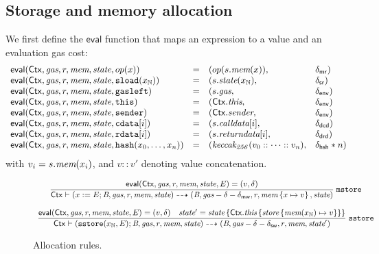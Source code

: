 \def\eval{\mathsf{eval}}
\subsection{Storage and memory allocation}\label{sec:alloc}
We first define the $\eval$ function that maps an expression to a value and an evaluation gas cost:
$$
\begin{array}{llll}
    \eval(\ctx, \textit{gas},r,\memory,\state, op(x)) &=& 
    (op(s.\memory(x)),&\dmr) \\
    \eval(\ctx, \textit{gas},r,\memory,\state, \sload{x_\Nat}) &=& (s.\state(x_\Nat),&\dsr)\\
    \eval(\ctx, \textit{gas}, r,\memory,\state, \mathtt{gasleft}) &=& (s.\textit{gas},&\denv) \\
    \eval(\ctx,\textit{gas}, r,\memory,\state,\mathtt{this}) &=& (\ctx.\thisVal,&\denv) \\
    \eval(\ctx, \textit{gas}, r,\memory,\state, \mathtt{sender}) &=& (\ctx.\senderVal,&\denv) \\
    \eval(\ctx, \textit{gas}, r,\memory,\state,\bcd[i]) &=& (s.\callDataVal[i],&\dcd) \\
    \eval(\ctx, \textit{gas}, r,\memory,\state,\brd[i]) &=& (s.\returnDataVal[i],&\drd) \\
    \eval(\ctx, \textit{gas}, r,\memory,\state, \hsh{x_0,\dots,x_n}) &=& (\mathit{keccak_{256}}(v_0::\dots::v_n), &\dhsh*n)
\end{array}
$$
with $v_i=s.\textit{mem}(x_i)$, and $v::v'$ denoting value concatenation.
 
\begin{figure}[ht]
$$
\begin{array}{c}
\dfrac{
\eval(\ctx,\textit{gas}, r,\memory,\state,E) = (v,\delta) 
}
{
\ctx\vdash 
(x:=E;\bytecode,\textit{gas}, r, \memory,\state) 
\rar 
(\bytecode,\textit{gas}-\delta-\delta_\mathsf{mw}, r,\memory\set{x\mapsto v},\state)
}\rlab{mstore}
\\\\
\dfrac{
\eval(\ctx,\textit{gas}, r,\memory,\state,E) = (v,\delta)
\quad
\state' = \state\set{\ctx.\thisVal\set{\store\set{\memory(x_\Nat)\mapsto v}}}
}
{
\ctx\vdash 
(\sstore{x_\Nat,E};\bytecode,\textit{gas}, r, \memory,\state) 
\rar 
(\bytecode,\textit{gas}-\delta-\delta_\mathsf{sw}, r,\memory,\state')
}\rlab{sstore}
\end{array}
$$
\caption{Allocation rules.}
\end{figure}